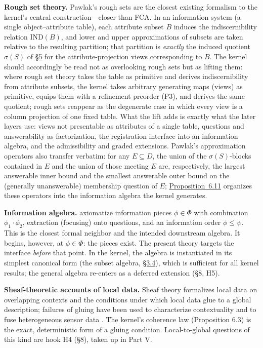 \textbf{Rough set theory.} Pawlak's rough sets \autocite{pawlak1982,pawlak1991} are the closest existing formalism to the kernel's central construction---\hspace{0pt}closer than FCA. In an information system (a single object--attribute table), each attribute subset \(B\) induces the indiscernibility relation \(\mathrm{IND}(B)\), and lower and upper approximations of subsets are taken relative to the resulting partition; that partition is \emph{exactly} the induced quotient \(\sigma(S)\) of \hyperlink{sec:5}{§5} for the attribute-projection views corresponding to \(B\). The kernel should accordingly be read not as overlooking rough sets but as lifting them: where rough set theory takes the table as primitive and derives indiscernibility from attribute subsets, the kernel takes arbitrary generating maps (views) as primitive, equips them with a refinement preorder (P3), and derives the same quotient; rough sets reappear as the degenerate case in which every view is a column projection of one fixed table. What the lift adds is exactly what the later layers use: views not presentable as attributes of a single table, questions and answerability as factorization, the registration interface into an information algebra, and the admissibility and graded extensions. Pawlak's approximation operators also transfer verbatim: for any \(E \subseteq D\), the union of the \(\sigma(S)\)-blocks contained in \(E\) and the union of those meeting \(E\) are, respectively, the largest answerable inner bound and the smallest answerable outer bound on the (generally unanswerable) membership question of \(E\); \hyperlink{stmt:6.11}{Proposition~6.11} organizes these operators into the information algebra the kernel generates.

\textbf{Information algebra.} \textcite{kohlas2003,kohlas2017,shenoy1990} axiomatize information pieces \(\phi \in \Phi\) with combination \(\phi_1 \cdot \phi_2\), extraction (focusing) onto questions, and an information order \(\phi \le \psi\). This is the closest formal neighbor and the intended downstream algebra. It begins, however, at \(\phi \in \Phi\): the pieces exist. The present theory targets the interface \emph{before} that point. In the kernel, the algebra is instantiated in its simplest canonical form (the subset algebra, \hyperlink{sec:3.4}{§3.4}), which is sufficient for all kernel results; the general algebra re-enters as a deferred extension (§8, H5).

\textbf{Sheaf-theoretic accounts of local data.} Sheaf theory formalizes local data on overlapping contexts and the conditions under which local data glue to a global description; failures of gluing have been used to characterize contextuality \autocite{abramsky2011} and to fuse heterogeneous sensor data \autocite{robinson2017}. The kernel's coherence law (Proposition 6.3) is the exact, deterministic form of a gluing condition. Local-to-global questions of this kind are hook H4 (§8), taken up in Part V.


